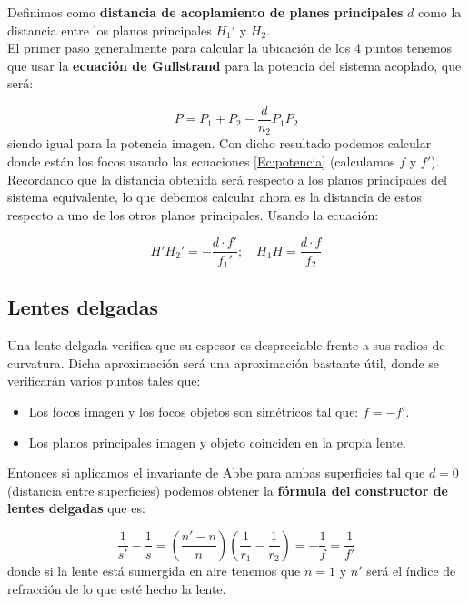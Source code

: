 \documentclass[12pt,a4paper]{article}
\newcommand{\parentesis}[1]{\left( #1  \right)}
\numberwithin{equation}{section}
\numberwithin{figure}{section}
\begin{document}
Definimos como \textbf{distancia de acoplamiento de planes principales} $d$ como la distancia entre los planos principales $H_1'$ y $H_2$. \\

El primer paso generalmente para calcular la ubicación de los 4 puntos tenemos que usar la \textbf{ecuación de Gullstrand} para la potencia del sistema acoplado, que será:

\begin{equation}
P = P_1 + P_2 - \dfrac{d}{n_2} P_1 P_2
\end{equation}
siendo igual para la potencia imagen. Con dicho resultado podemos calcular donde están los focos usando las ecuaciones \ref{Ec:potencia} (calculamos $f$ y $f'$). Recordando que la distancia obtenida será respecto a los planos principales del sistema equivalente, lo que debemos calcular ahora es la distancia de estos respecto a uno de los otros planos principales. Usando la ecuación:

\begin{equation}
H'H_2' = - \dfrac{d \cdot f'}{f_1'}; \quad H_1 H = \dfrac{d \cdot f}{f_2} 
\end{equation}
\subsection{Lentes delgadas}
Una lente delgada verifica que su espesor es despreciable frente a sus radios de curvatura. Dicha aproximación será una aproximación bastante útil, donde se verificarán varios puntos tales que:

\begin{itemize}
\item Los focos imagen y los focos objetos son simétricos tal que: $f = - f'$.
\item Los planos principales imagen y objeto coinciden en la propia lente.
\end{itemize}

Entonces si aplicamos el invariante de Abbe para ambas superficies tal que $d=0$ (distancia entre superficies) podemos obtener la \textbf{fórmula del constructor de lentes delgadas} que es:

\begin{equation}
\dfrac{1}{s'}-\dfrac{1}{s} =  \parentesis{\dfrac{n'-n}{n}} \parentesis{\dfrac{1}{r_1}-\dfrac{1}{r_2}} = - \dfrac{1}{f} = \dfrac{1}{f'}
\end{equation}
donde si la lente está sumergida en aire tenemos que $n=1$ y $n'$ será el índice de refracción de lo que esté hecho la lente.
\end{document}
